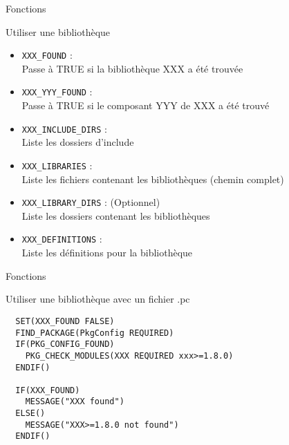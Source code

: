 \documentclass{beamer}
\begin{document}
\begin{frame}[fragile]{Fonctions}
  \begin{block}{Utiliser une bibliothèque}
    \begin{itemize}
    \item \verb?XXX_FOUND? :\\
      Passe à TRUE si la bibliothèque XXX a été trouvée
    \item \verb?XXX_YYY_FOUND? :\\
      Passe à TRUE si le composant YYY de XXX a été trouvé
    \item \verb?XXX_INCLUDE_DIRS? :\\
      Liste les dossiers d'include
    \item \verb?XXX_LIBRARIES? :\\
      Liste les fichiers contenant les bibliothèques (chemin complet)
    \item \verb?XXX_LIBRARY_DIRS? : (Optionnel)\\
      Liste les dossiers contenant les bibliothèques
    \item \verb?XXX_DEFINITIONS? :\\
      Liste les définitions pour la bibliothèque
    \end{itemize}
  \end{block}
\end{frame}


\begin{frame}[fragile]{Fonctions}
  \begin{block}{Utiliser une bibliothèque avec un fichier .pc}
\begin{verbatim}
  SET(XXX_FOUND FALSE)
  FIND_PACKAGE(PkgConfig REQUIRED)
  IF(PKG_CONFIG_FOUND)
    PKG_CHECK_MODULES(XXX REQUIRED xxx>=1.8.0)
  ENDIF()

  IF(XXX_FOUND)
    MESSAGE("XXX found")
  ELSE()
    MESSAGE("XXX>=1.8.0 not found")
  ENDIF()
\end{verbatim}
  \end{block}
\end{frame}
\end{document}
